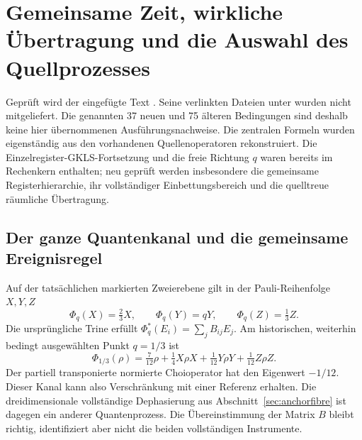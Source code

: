 \section{Gemeinsame Zeit, wirkliche Übertragung und die Auswahl des Quellprozesses}\label{sec:sharedtime}


Geprüft wird der eingefügte Text . Seine verlinkten Dateien unter  wurden nicht mitgeliefert. Die genannten 37 neuen und 75 älteren Bedingungen sind deshalb keine hier übernommenen Ausführungsnachweise. Die zentralen Formeln wurden eigenständig aus den vorhandenen Quellenoperatoren rekonstruiert. Die Einzelregister-GKLS-Fortsetzung und die freie Richtung $q$ waren bereits im Rechenkern enthalten; neu geprüft werden insbesondere die gemeinsame Registerhierarchie, ihr vollständiger Einbettungsbereich und die quelltreue räumliche Übertragung.

\subsection{Der ganze Quantenkanal und die gemeinsame Ereignisregel}
Auf der tatsächlichen markierten Zweierebene gilt in der Pauli-Reihenfolge $X,Y,Z$
\begin{equation}
\Phi_q(X)=\tfrac23X,\qquad \Phi_q(Y)=qY,\qquad \Phi_q(Z)=\tfrac13Z.
\end{equation}
Die ursprüngliche Trine erfüllt $\Phi_q^*(E_i)=\sum_jB_{ij}E_j$.
Am historischen, weiterhin bedingt ausgewählten Punkt $q=1/3$ ist
\begin{equation}
\Phi_{1/3}(\rho)=\tfrac7{12}\rho+\tfrac14X\rho X
+\tfrac1{12}Y\rho Y+\tfrac1{12}Z\rho Z.
\end{equation}
Der partiell transponierte normierte Choioperator hat den Eigenwert $-1/12$. Dieser Kanal kann also Verschränkung mit einer Referenz erhalten. Die dreidimensionale vollständige Dephasierung aus Abschnitt~\ref{sec:anchorfibre} ist dagegen ein anderer Quantenprozess. Die Übereinstimmung der Matrix $B$ bleibt richtig, identifiziert aber nicht die beiden vollständigen Instrumente.

